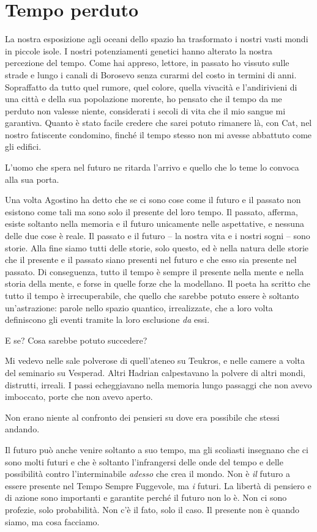 \chapter{Tempo perduto}

La nostra esposizione agli oceani dello spazio ha trasformato i nostri
vasti mondi in piccole isole. I nostri potenziamenti genetici hanno
alterato la nostra percezione del tempo. Come hai appreso, lettore, in
passato ho vissuto sulle strade e lungo i canali di Borosevo senza
curarmi del costo in termini di anni. Sopraffatto da tutto quel rumore,
quel colore, quella vivacità e l'andirivieni di una città e della sua
popolazione morente, ho pensato che il tempo da me perduto non valesse
niente, considerati i secoli di vita che il mio sangue mi garantiva.
Quanto è stato facile credere che sarei potuto rimanere là, con Cat, nel
nostro fatiscente condomino, finché il tempo stesso non mi avesse
abbattuto come gli edifici.

L'uomo che
spera nel futuro ne ritarda l'arrivo e quello che lo teme lo convoca
alla sua porta.

Una volta Agostino ha detto che se ci sono cose come il futuro e il
passato non esistono come tali ma sono solo il presente del loro tempo.
Il passato, afferma, esiste soltanto nella memoria e il futuro
unicamente nelle aspettative, e nessuna delle due cose è reale. Il
passato e il futuro -- la nostra vita e i nostri sogni -- sono storie.
Alla fine siamo tutti delle storie, solo questo, ed è nella natura delle
storie che il presente e il passato siano presenti nel futuro e che esso
sia presente nel passato. Di conseguenza, tutto il tempo è sempre il
presente nella mente e nella storia della mente, e forse in quelle forze
che la modellano. Il poeta ha scritto che tutto il tempo è
irrecuperabile, che quello che sarebbe potuto essere è soltanto
{un'astrazione}: parole nello spazio quantico, irrealizzate, che a loro
volta definiscono gli eventi tramite la loro esclusione \emph{da} essi.

E se? Cosa sarebbe potuto succedere?

Mi vedevo nelle sale polverose di quell'ateneo su Teukros, e nelle
camere a volta del seminario su Vesperad. Altri Hadrian calpestavano la
polvere di altri mondi, distrutti, irreali. I passi echeggiavano nella
memoria lungo passaggi che non avevo imboccato, porte che non avevo
aperto.

Non erano niente al confronto dei pensieri su dove era possibile che
stessi andando.

Il futuro può anche venire soltanto a suo tempo, ma gli scoliasti
insegnano che ci sono molti futuri e che è soltanto l'infrangersi delle
onde del tempo e delle possibilità contro l'interminabile \emph{adesso}
che crea il mondo. Non è \emph{il} futuro a essere presente nel Tempo
Sempre Fuggevole, ma \emph{i} futuri. La libertà di pensiero e di azione
sono importanti e garantite perché il futuro non lo è. Non ci sono
profezie, solo probabilità. Non c'è il fato, solo il caso. Il presente
non è quando siamo, ma cosa facciamo.

